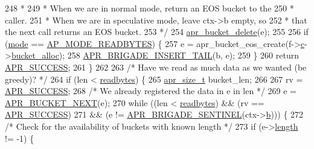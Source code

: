 \begin{DoxyCode}
248 \textcolor{comment}{             *}
249 \textcolor{comment}{             * When we are in normal mode, return an EOS bucket to the}
250 \textcolor{comment}{             * caller.}
251 \textcolor{comment}{             * When we are in speculative mode, leave ctx->b empty, so}
252 \textcolor{comment}{             * that the next call returns an EOS bucket.}
253 \textcolor{comment}{             */}
254             \hyperlink{group__APR__Util__Bucket__Brigades_ga8925c02a7f95e8c1c3986294d4678797}{apr\_bucket\_delete}(e);
255 
256             \textcolor{keywordflow}{if} (\hyperlink{group__APACHE__CORE__FILTER_gad194431669b7d1f96d2dacfb7be21261}{mode} == \hyperlink{util__filter_8h_ab570898d09fbbe5b6d838e28b90134e0a2d8e63e1da380c3909ac0a1325339de4}{AP\_MODE\_READBYTES}) \{
257                 e = apr\_bucket\_eos\_create(f->\hyperlink{structap__filter__t_afb039953f0c62d8455aa9f4bdd3ef487}{c}->\hyperlink{structconn__rec_a5a9ee4911c5a655131f76a04036fb4c0}{bucket\_alloc});
258                 \hyperlink{group__APR__Util__Bucket__Brigades_ga5447595f8374296c5ffe208db39b2f5d}{APR\_BRIGADE\_INSERT\_TAIL}(b, e);
259             \}
260             \textcolor{keywordflow}{return} \hyperlink{group__apr__errno_ga9ee311b7bf1c691dc521d721339ee2a6}{APR\_SUCCESS};
261         \}
262 
263         \textcolor{comment}{/* Have we read as much data as we wanted (be greedy)? */}
264         \textcolor{keywordflow}{if} (len < \hyperlink{group__APACHE__CORE__FILTER_ga0ce3dc88443223a04b0d1a3167356aee}{readbytes}) \{
265             \hyperlink{group__apr__platform_gaaa72b2253f6f3032cefea5712a27540e}{apr\_size\_t} bucket\_len;
266 
267             rv = \hyperlink{group__apr__errno_ga9ee311b7bf1c691dc521d721339ee2a6}{APR\_SUCCESS};
268             \textcolor{comment}{/* We already registered the data in e in len */}
269             e = \hyperlink{group__APR__Util__Bucket__Brigades_ga7171f690b203d548a5b6ae0b079068d8}{APR\_BUCKET\_NEXT}(e);
270             \textcolor{keywordflow}{while} ((len < \hyperlink{group__APACHE__CORE__FILTER_ga0ce3dc88443223a04b0d1a3167356aee}{readbytes}) && (rv == \hyperlink{group__apr__errno_ga9ee311b7bf1c691dc521d721339ee2a6}{APR\_SUCCESS})
271                    && (e != \hyperlink{group__APR__Util__Bucket__Brigades_ga858da66dccab1e063415678bb115788a}{APR\_BRIGADE\_SENTINEL}(ctx->\hyperlink{structcore__filter__ctx_ab083b63e4b9c6f6a8b722fefd6e18da3}{b}))) \{
272                 \textcolor{comment}{/* Check for the availability of buckets with known length */}
273                 \textcolor{keywordflow}{if} (e->\hyperlink{structapr__bucket_a0898dfc78d9275187189b9a745e619bf}{length} != -1) \{

\end{DoxyCode}
